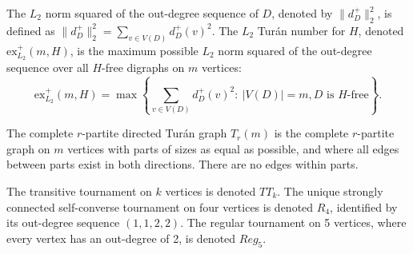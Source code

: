 \documentclass[a4paper]{amsart}
\begin{document}
The $L_2$ norm squared of the out-degree sequence of $D$, denoted by $\|d^+_D\|_2^2$, is defined as $\|d^+_D\|_2^2 = \sum_{v \in V(D)} d^+_D(v)^2$.
The $L_2$ Tur\'an number for $H$, denoted $\text{ex}^+_{L_2}(m, H)$, is the maximum possible $L_2$ norm squared of the out-degree sequence over all $H$-free digraphs on $m$ vertices:
\[ \text{ex}^+_{L_2}(m, H) = \max \left\{ \sum_{v \in V(D)} d^+_D(v)^2 : \ |V(D)| = m, D \text{ is } H\text{-free} \right\}. \]

The complete $r$-partite directed Tur\'an graph $T_r(m)$ is the complete $r$-partite graph on $m$ vertices with parts of sizes as equal as possible, and where all edges between parts exist in both directions.
There are no edges within parts.

The transitive tournament on $k$ vertices is denoted $TT_k$.
The unique strongly connected self-converse tournament on four vertices is denoted $R_4$, identified by its out-degree sequence $(1,1,2,2)$. The regular tournament on 5 vertices, where every vertex has an out-degree of 2, is denoted $Reg_5$.
\end{document}
